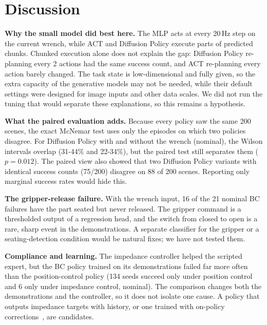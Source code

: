 \documentclass[conference]{IEEEtran}
\begin{document}
\section{Discussion}
\textbf{Why the small model did best here.} The MLP acts at every 20\,Hz step on the current wrench, while ACT and Diffusion Policy execute parts of predicted chunks. Chunked execution alone does not explain the gap: Diffusion Policy re-planning every 2 actions had the same success count, and ACT re-planning every action barely changed. The task state is low-dimensional and fully given, so the extra capacity of the generative models may not be needed, while their default settings were designed for image inputs and other data scales. We did not run the tuning that would separate these explanations, so this remains a hypothesis.

\textbf{What the paired evaluation adds.} Because every policy saw the same 200 scenes, the exact McNemar test uses only the episodes on which two policies disagree. For Diffusion Policy with and without the wrench (nominal), the Wilson intervals overlap (31-44\% and 22-34\%), but the paired test still separates them ($p = 0.012$). The paired view also showed that two Diffusion Policy variants with identical success counts (75/200) disagree on 88 of 200 scenes. Reporting only marginal success rates would hide this.

\textbf{The gripper-release failure.} With the wrench input, 16 of the 21 nominal BC failures have the part seated but never released. The gripper command is a thresholded output of a regression head, and the switch from closed to open is a rare, sharp event in the demonstrations. A separate classifier for the gripper or a seating-detection condition would be natural fixes; we have not tested them.

\textbf{Compliance and learning.} The impedance controller helped the scripted expert, but the BC policy trained on its demonstrations failed far more often than the position-control policy (134 seeds succeed only under position control and 6 only under impedance control, nominal). The comparison changes both the demonstrations and the controller, so it does not isolate one cause. A policy that outputs impedance targets with history, or one trained with on-policy corrections~\cite{ross2011dagger}, are candidates.
\end{document}
